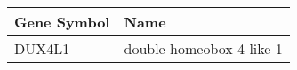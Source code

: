 \begin{tabular}{ll}
\toprule
Gene Symbol &                     Name \\
\midrule
     DUX4L1 & double homeobox 4 like 1 \\
\bottomrule
\end{tabular}
